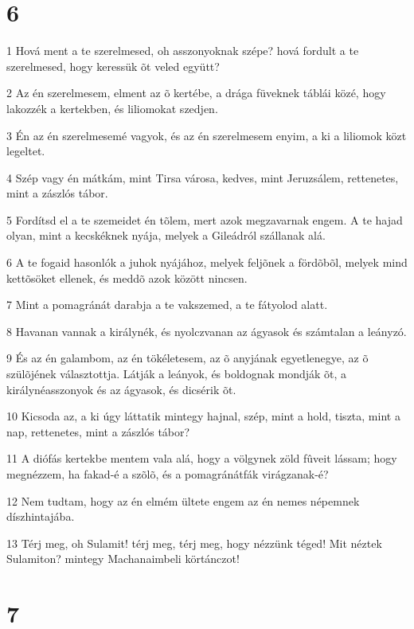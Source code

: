 \chapter{6}

\par 1 Hová ment a te szerelmesed, oh asszonyoknak szépe? hová fordult a te szerelmesed, hogy keressük õt veled együtt?
\par 2 Az én szerelmesem, elment az õ kertébe, a drága füveknek táblái közé, hogy lakozzék a kertekben, és liliomokat szedjen.
\par 3 Én az én szerelmesemé vagyok, és az én szerelmesem enyim, a ki a liliomok közt legeltet.
\par 4 Szép vagy én mátkám, mint Tirsa városa, kedves, mint Jeruzsálem, rettenetes, mint a zászlós tábor.
\par 5 Fordítsd el a te szemeidet én tõlem, mert azok megzavarnak engem. A te hajad olyan, mint a kecskéknek nyája, melyek a Gileádról szállanak alá.
\par 6 A te fogaid hasonlók a juhok nyájához, melyek feljõnek a fördõbõl, melyek mind kettõsöket ellenek, és meddõ azok között nincsen.
\par 7 Mint a pomagránát darabja a te vakszemed, a te fátyolod alatt.
\par 8 Havanan vannak a királynék, és nyolczvanan az ágyasok és számtalan a leányzó.
\par 9 És az én galambom, az én tökéletesem, az õ anyjának egyetlenegye, az õ szülõjének választottja. Látják a leányok, és boldognak mondják õt, a királynéasszonyok és az ágyasok, és dicsérik õt.
\par 10 Kicsoda az, a ki úgy láttatik mintegy hajnal, szép, mint a hold, tiszta, mint a nap, rettenetes, mint a zászlós tábor?
\par 11 A diófás kertekbe mentem vala alá, hogy a völgynek zöld fûveit lássam; hogy megnézzem, ha fakad-é a szõlõ, és a pomagránátfák virágzanak-é?
\par 12 Nem tudtam, hogy az én elmém ültete engem az én nemes népemnek díszhintajába.
\par 13 Térj meg, oh Sulamit! térj meg, térj meg, hogy nézzünk téged! Mit néztek Sulamiton? mintegy Machanaimbeli körtánczot!

\chapter{7}

